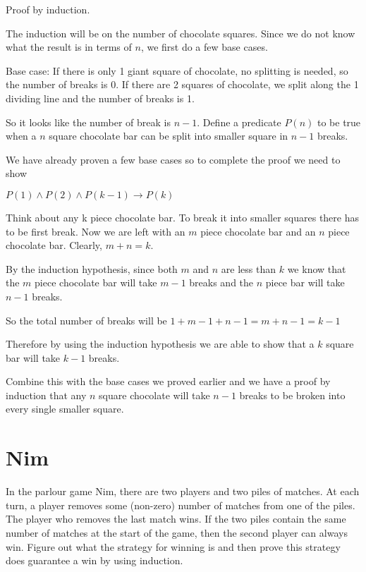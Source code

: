 \documentclass[12pt]{article}
\begin{document}
\medskip

Proof by induction.

The induction will be on the number of chocolate squares. Since we do not know what the result is in terms of $n$, we first do a few base cases.

Base case: If there is only 1 giant square of chocolate, no splitting is needed, so the number of breaks is 0. If there are 2 squares of chocolate, we split along the 1 dividing line and the number of breaks is 1.

So it looks like the number of break is $n-1$. Define a predicate $P(n)$ to be true when a $n$ square chocolate bar can be split into smaller square in $n-1$ breaks. 

We have already proven a few base cases so to complete the proof we need to show

$P(1) \wedge P(2) \wedge P(k-1) \rightarrow P(k)$

Think about any k piece chocolate bar. To break it into smaller squares there has to be first break. Now we are left with an $m$ piece chocolate bar and an $n$ piece chocolate bar. Clearly, $m +n = k$.


By the induction hypothesis, since both $m$ and $n$ are less than $k$ we know that the $m$ piece chocolate bar will take $m-1$ breaks and the $n$ piece bar will take $n-1$ breaks.

So the total number of breaks will be $1 + m-1 + n- 1 = m+n -1 = k - 1$

Therefore by using the induction hypothesis we are able to show that a $k$ square bar will take $k-1$ breaks. 

Combine this with the base cases we proved earlier and we have a proof by induction that any $n$ square chocolate will take $n-1$ breaks to be broken into every single smaller square.


\section*{Nim}
In the parlour game Nim, there are two players and two piles of matches. At each
turn, a player removes some (non-zero) number of matches from one of the piles. The
player who removes the last match wins. If the two piles contain the same number of
matches at the start of the game, then the second player can always win. Figure out
what the strategy for winning is and then prove this strategy does guarantee a win by
using induction.

\medskip
\end{document}
